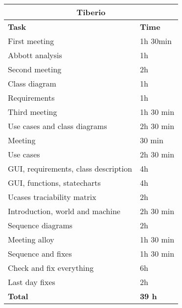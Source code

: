 \begin{table}[H]
\begin{tabular}{|l|l|}
\hline
\multicolumn{2}{|c|}{\textbf{Tiberio}}            \\ \hline
\textbf{Task}                   & \textbf{Time} \\ \hline
First meeting                        & 1h 30min     \\ \hline
Abbott analysis                      & 1h        \\ \hline
Second meeting                       & 2h        \\ \hline
Class diagram                        & 1h        \\ \hline
Requirements                         & 1h        \\ \hline
Third meeting                        & 1h 30 min \\ \hline
Use cases and class diagrams         & 2h 30 min \\ \hline
Meeting                              & 30 min    \\ \hline
Use cases                            & 2h 30 min \\ \hline
GUI, requirements, class description & 4h        \\ \hline
GUI, functions, statecharts          & 4h        \\ \hline
Ucases traciability matrix           & 2h        \\ \hline
Introduction, world and machine      & 2h 30 min \\ \hline
Sequence diagrams                    & 2h        \\ \hline
Meeting alloy                        & 1h 30 min \\ \hline
Sequence and fixes                   & 1h 30 min \\ \hline
Check and fix everything             & 6h        \\ \hline
Last day fixes                       & 2h        \\ \hline
\rowcolor {polilight}
\textbf{Total}                  & \textbf{39 h}   \\ \hline
\end{tabular}
\end{table}


